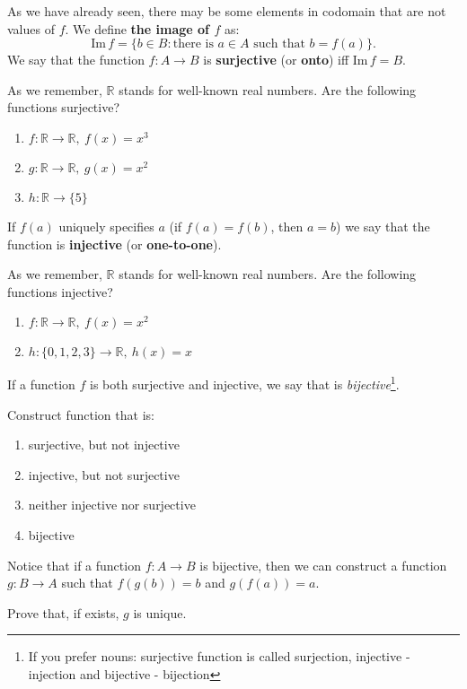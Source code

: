 \noindent As we have already seen, there may be some elements in codomain that are not values of 
$f$. We define \textbf{the image of $f$} as:
$$\text{Im}\, f = \{b\in B : \text{there is } a\in A \text{ such that } b=f(a)\}.$$
We say that the function $f: A\to B$ is \textbf{surjective} (or \textbf{onto}) iff $\text{Im}\,f=B$.

\begin{prob}
	As we remember, $\mathbb{R}$ stands for well-known real numbers. Are the following functions surjective?
	\begin{enumerate}
		\item $f: \mathbb{R} \to \mathbb{R}, ~f(x)=x^3$
		\item $g: \mathbb{R} \to \mathbb{R}, ~g(x)=x^2$
		\item $h: \mathbb{R} \to \{5\}$
	\end{enumerate}
\end{prob}

If $f(a)$ uniquely specifies $a$ (if $f(a)=f(b)$, then $a=b$) we say that the function is \textbf{injective}
(or \textbf{one-to-one}).
\begin{prob}
	As we remember, $\mathbb{R}$ stands for well-known real numbers. Are the following functions injective?
	\begin{enumerate}
		\item $f: \mathbb{R} \to \mathbb R, ~f(x)=x^2$
		\item $h: \{0,1,2,3\} \to \mathbb R, ~h(x)=x$
	\end{enumerate}
\end{prob}

If a function $f$ is both surjective and injective, we say that is \textit{bijective}\footnote{If you prefer nouns: surjective function is called surjection, injective - injection
and bijective - bijection}.

\begin{prob}
	Construct function that is:
	\begin{enumerate}
		\item surjective, but not injective
		\item injective, but not surjective
		\item neither injective nor surjective
		\item bijective
	\end{enumerate}
\end{prob}

\noindent Notice that if a function $f: A\to B$ is bijective, then we can construct a function $g:B\to A$ 
such that $f(g(b))=b$ and $g(f(a))=a$.
\begin{prob}
	Prove that, if exists, $g$ is unique.
\end{prob}

